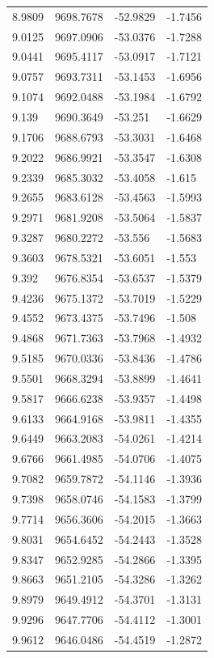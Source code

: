 \begin{table}[H]
\begin{tabular}{llll}
8.9809 & 9698.7678 & -52.9829 & -1.7456 \\
9.0125 & 9697.0906 & -53.0376 & -1.7288 \\
9.0441 & 9695.4117 & -53.0917 & -1.7121 \\
9.0757 & 9693.7311 & -53.1453 & -1.6956 \\
9.1074 & 9692.0488 & -53.1984 & -1.6792 \\
9.139 & 9690.3649 & -53.251 & -1.6629 \\
9.1706 & 9688.6793 & -53.3031 & -1.6468 \\
9.2022 & 9686.9921 & -53.3547 & -1.6308 \\
9.2339 & 9685.3032 & -53.4058 & -1.615 \\
9.2655 & 9683.6128 & -53.4563 & -1.5993 \\
9.2971 & 9681.9208 & -53.5064 & -1.5837 \\
9.3287 & 9680.2272 & -53.556 & -1.5683 \\
9.3603 & 9678.5321 & -53.6051 & -1.553 \\
9.392 & 9676.8354 & -53.6537 & -1.5379 \\
9.4236 & 9675.1372 & -53.7019 & -1.5229 \\
9.4552 & 9673.4375 & -53.7496 & -1.508 \\
9.4868 & 9671.7363 & -53.7968 & -1.4932 \\
9.5185 & 9670.0336 & -53.8436 & -1.4786 \\
9.5501 & 9668.3294 & -53.8899 & -1.4641 \\
9.5817 & 9666.6238 & -53.9357 & -1.4498 \\
9.6133 & 9664.9168 & -53.9811 & -1.4355 \\
9.6449 & 9663.2083 & -54.0261 & -1.4214 \\
9.6766 & 9661.4985 & -54.0706 & -1.4075 \\
9.7082 & 9659.7872 & -54.1146 & -1.3936 \\
9.7398 & 9658.0746 & -54.1583 & -1.3799 \\
9.7714 & 9656.3606 & -54.2015 & -1.3663 \\
9.8031 & 9654.6452 & -54.2443 & -1.3528 \\
9.8347 & 9652.9285 & -54.2866 & -1.3395 \\
9.8663 & 9651.2105 & -54.3286 & -1.3262 \\
9.8979 & 9649.4912 & -54.3701 & -1.3131 \\
9.9296 & 9647.7706 & -54.4112 & -1.3001 \\
9.9612 & 9646.0486 & -54.4519 & -1.2872 \\

\end{tabular}
\end{table}
